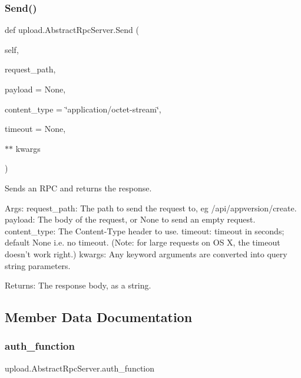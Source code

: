 \subsubsection{\texorpdfstring{Send()}{Send()}\hspace{0.1cm}{\footnotesize\ttfamily [2/2]}}
{\footnotesize\ttfamily def upload.\+Abstract\+Rpc\+Server.\+Send (\begin{DoxyParamCaption}\item[{}]{self,  }\item[{}]{request\+\_\+path,  }\item[{}]{payload = {\ttfamily None},  }\item[{}]{content\+\_\+type = {\ttfamily \char`\"{}application/octet-\/stream\char`\"{}},  }\item[{}]{timeout = {\ttfamily None},  }\item[{$\ast$$\ast$}]{kwargs }\end{DoxyParamCaption})}

\begin{DoxyVerb}Sends an RPC and returns the response.

Args:
  request_path: The path to send the request to, eg /api/appversion/create.
  payload: The body of the request, or None to send an empty request.
  content_type: The Content-Type header to use.
  timeout: timeout in seconds; default None i.e. no timeout.
(Note: for large requests on OS X, the timeout doesn't work right.)
  kwargs: Any keyword arguments are converted into query string parameters.

Returns:
  The response body, as a string.
\end{DoxyVerb}
 

\subsection{Member Data Documentation}
\mbox{\label{classupload_1_1_abstract_rpc_server_aee0090a3bcf07b913a7dd596a5dabb8f}} 
\subsubsection{\texorpdfstring{auth\_function}{auth\_function}}
{\footnotesize\ttfamily upload.\+Abstract\+Rpc\+Server.\+auth\+\_\+function}

